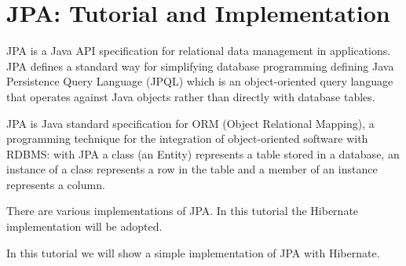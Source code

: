 \chapter{JPA: Tutorial and Implementation}

JPA is a Java API specification for relational data management in applications.
JPA defines a standard way for simplifying database programming defining Java
Persistence Query Language (JPQL) which is an object-oriented query language
that operates against Java objects rather than directly with database tables.

JPA is Java standard specification for ORM (Object Relational Mapping), a
programming technique for the integration of object-oriented software with
RDBMS: with JPA a class (an Entity) represents a table stored in a database, an
instance of a class represents a row in the table and a member of an instance
represents a column.

There are various implementations of JPA\@. In this tutorial the Hibernate
implementation will be adopted.

In this tutorial we will show a simple implementation of JPA with Hibernate.


